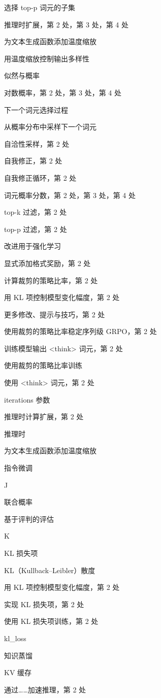 选择 top-p 词元的子集

推理时扩展，第 2 处，第 3 处，第 4 处

为文本生成函数添加温度缩放

用温度缩放控制输出多样性

似然与概率

对数概率，第 2 处，第 3 处，第 4 处

下一个词元选择过程

从概率分布中采样下一个词元

自洽性采样，第 2 处

自我修正，第 2 处

自我修正循环，第 2 处

词元概率分数，第 2 处，第 3 处，第 4 处

top-k 过滤，第 2 处

top-p 过滤，第 2 处

改进用于强化学习

显式添加格式奖励，第 2 处

计算裁剪的策略比率，第 2 处

用 KL 项控制模型变化幅度，第 2 处

更多修改、提示与技巧，第 2 处

使用裁剪的策略比率稳定序列级 GRPO，第 2 处

训练模型输出 \textless{}think\textgreater{} 词元，第 2 处

使用裁剪的策略比率训练

使用 \textless{}think\textgreater{} 词元，第 2 处

iterations 参数

推理时计算扩展，第 2 处

推理时

为文本生成函数添加温度缩放

指令微调

J

联合概率

基于评判的评估

K

KL 损失项

KL（Kullback–Leibler）散度

用 KL 项控制模型变化幅度，第 2 处

实现 KL 损失项，第 2 处

使用 KL 损失项训练，第 2 处

kl\_loss

知识蒸馏

KV 缓存

通过……加速推理，第 2 处

